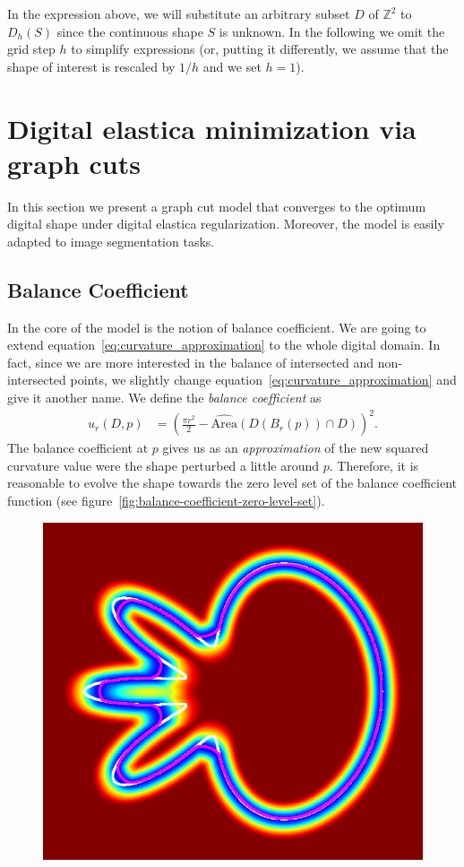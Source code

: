 \documentclass[runningheads]{llncs}
\newcommand{\daniel}[1]{ {\color{blue}#1} }
\newcommand{\Ds}{D}
\begin{document}
In the expression above, we will substitute an arbitrary
subset $\Ds$ of $\mathbb{Z}^2$ to $D_h(S)$ since the continuous shape $S$ is unknown.  In the following we omit
the grid step $h$ to simplify expressions (or, putting it differently, we assume that the shape of interest is
rescaled by $1/h$ and we set $h=1$).


\section{Digital elastica minimization via graph cuts}
In this section we present a graph cut model that converges to the optimum digital shape under digital elastica
regularization. Moreover, the model is easily adapted to image segmentation tasks. 

\daniel{\subsection{Balance Coefficient}
In the core of the model is the notion of balance coefficient. We are going to extend equation~\ref{eq:curvature_approximation} to the whole digital domain. In fact, since we are more interested in the  balance of intersected and non-intersected points, we slightly change equation~\ref{eq:curvature_approximation} and give it another name. We define the \emph{balance coefficient} as
%
\begin{align*}
	u_r(D,p) &= \left( \frac{\pi r^2}{2} - \widehat{\text{Area}}(D(B_r(p)) \cap D) \right)^2.
\end{align*}
%
 The balance coefficient at $p$ gives us as an \emph{approximation} of the new squared curvature value were the shape perturbed a little around $p$. Therefore, it is reasonable to evolve the shape towards the zero level set of the balance coefficient function (see figure~\ref{fig:balance-coefficient-zero-level-set}).
\begin{figure}
 \center
 \includegraphics[scale=0.32]{figures/zero-level-set/balance-coefficient-zero-level-set.png}

\end{figure}}
\end{document}
